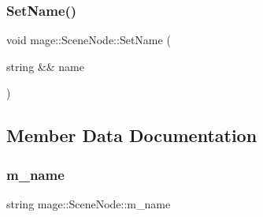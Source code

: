 \hypertarget{classmage_1_1_scene_node_a3dc6b033a811a9e1d6da0aa85b4f281b}{}\label{classmage_1_1_scene_node_a3dc6b033a811a9e1d6da0aa85b4f281b} 
\subsubsection{\texorpdfstring{Set\+Name()}{SetName()}\hspace{0.1cm}{\footnotesize\ttfamily [2/2]}}
{\footnotesize\ttfamily void mage\+::\+Scene\+Node\+::\+Set\+Name (\begin{DoxyParamCaption}\item[{string \&\&}]{name }\end{DoxyParamCaption})\hspace{0.3cm}{\ttfamily [noexcept]}}



\subsection{Member Data Documentation}
\hypertarget{classmage_1_1_scene_node_a3ba13ec190df3e020c89d2ace0301dec}{}\label{classmage_1_1_scene_node_a3ba13ec190df3e020c89d2ace0301dec} 
\subsubsection{\texorpdfstring{m\+\_\+name}{m\_name}}
{\footnotesize\ttfamily string mage\+::\+Scene\+Node\+::m\+\_\+name\hspace{0.3cm}{\ttfamily [private]}}

